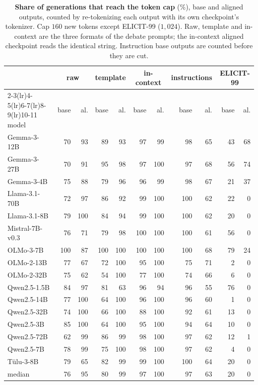 \begin{table}[tb]\centering\scriptsize\setlength{\tabcolsep}{3.5pt}
\caption{\textbf{Share of generations that reach the token cap} (\%), base and aligned outputs, counted by re-tokenizing each output with its own checkpoint's tokenizer. Cap $160$ new tokens except ELICIT-99 ($1{,}024$). Raw, template and in-context are the three formats of the debate prompts; the in-context aligned checkpoint reads the identical string. Instruction base outputs are counted before they are cut.}\label{tab:tavan}
\begin{tabular}{lrrrrrrrrrr}\toprule
 & \multicolumn{2}{c}{raw} & \multicolumn{2}{c}{template} & \multicolumn{2}{c}{in-context} & \multicolumn{2}{c}{instructions} & \multicolumn{2}{c}{ELICIT-99} \\
\cmidrule(lr){2-3}\cmidrule(lr){4-5}\cmidrule(lr){6-7}\cmidrule(lr){8-9}\cmidrule(lr){10-11}
model & base & al. & base & al. & base & al. & base & al. & base & al. \\ \midrule
Gemma-3-12B & 70 & 93 & 89 & 93 & 97 & 99 & 98 & 65 & 43 & 68 \\
Gemma-3-27B & 70 & 91 & 95 & 98 & 97 & 100 & 97 & 68 & 56 & 74 \\
Gemma-3-4B & 75 & 88 & 79 & 96 & 96 & 99 & 98 & 67 & 21 & 37 \\
Llama-3.1-70B & 72 & 97 & 86 & 92 & 99 & 100 & 100 & 62 & 22 & 0 \\
Llama-3.1-8B & 79 & 100 & 84 & 94 & 99 & 100 & 100 & 62 & 20 & 0 \\
Mistral-7B-v0.3 & 76 & 71 & 79 & 98 & 100 & 100 & 100 & 61 & 56 & 0 \\
OLMo-3-7B & 100 & 87 & 100 & 100 & 100 & 100 & 100 & 68 & 79 & 24 \\
OLMo-2-13B & 77 & 67 & 72 & 100 & 95 & 100 & 75 & 71 & 2 & 0 \\
OLMo-2-32B & 75 & 62 & 54 & 100 & 77 & 100 & 74 & 66 & 6 & 0 \\
Qwen2.5-1.5B & 84 & 97 & 81 & 63 & 96 & 94 & 96 & 55 & 76 & 0 \\
Qwen2.5-14B & 77 & 100 & 64 & 100 & 96 & 100 & 96 & 60 & 1 & 0 \\
Qwen2.5-32B & 74 & 100 & 66 & 100 & 88 & 100 & 92 & 61 & 13 & 0 \\
Qwen2.5-3B & 85 & 100 & 64 & 100 & 95 & 100 & 94 & 64 & 10 & 0 \\
Qwen2.5-72B & 62 & 99 & 86 & 99 & 98 & 100 & 97 & 62 & 12 & 1 \\
Qwen2.5-7B & 78 & 99 & 75 & 100 & 98 & 100 & 97 & 62 & 4 & 0 \\
T\"ulu-3-8B & 79 & 65 & 82 & 99 & 99 & 100 & 100 & 64 & 20 & 0 \\
\midrule median & 76 & 95 & 80 & 99 & 97 & 100 & 97 & 63 & 20 & 0 \\
\bottomrule\end{tabular}\end{table}

